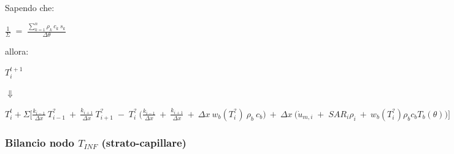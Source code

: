 \vspace{0.5cm}
\noindent
\hspace{2cm} Sapendo che:
\vspace{-0.3cm}

\begin{center}
    $\frac{1}{\Sigma} \;=\; \frac{\sum_{k=1}^{n} \rho _{k} \: c_{k} \: s_{k}}{\Delta \theta}$
\end{center}



\vspace{0.3cm}
\noindent
\hspace{2cm} allora:
\vspace{-0.3cm}


\begin{center}
	$T_i ^{t+1}$
	\begin{center}
		\begin{center}
			$\Downarrow$
		\end{center}
	\end{center}
	$T_i ^t + \Sigma \Bigg[ \frac{k_{i-1}}{\Delta x} \: T_{i-1}^? \:+\: \frac{k_{i+1}}{\Delta x}\: T_{i+1}^? \;-\; T_i^?\:\Big(\frac{k_{i-1}}{\Delta x}  \:+\: \frac{k_{i+1}}{\Delta x} \:+\:  \Delta x \: w_b (T_i^?) \: \rho _b \: c_b \Big) \:+\: \Delta x \: \Big(\Dot{u}_{m,i} \;+\; SAR_{i} \rho_{i} \:+\:  w_b (T_i^?) \rho _b c_b T_b(\theta)\Big) \Bigg]$
\end{center}














\vspace{3cm}
























\subsubsection*{\hspace{1cm} Bilancio nodo $T_{INF}$ (strato-capillare)}

